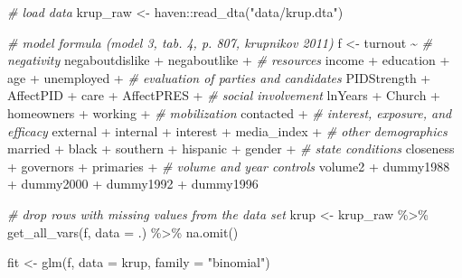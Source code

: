 \documentclass[
]{book}
\newenvironment{Shaded}{\begin{snugshade}}{\end{snugshade}}
\newcommand{\AttributeTok}[1]{\textcolor[rgb]{0.77,0.63,0.00}{#1}}
\newcommand{\CommentTok}[1]{\textcolor[rgb]{0.56,0.35,0.01}{\textit{#1}}}
\newcommand{\FunctionTok}[1]{\textcolor[rgb]{0.00,0.00,0.00}{#1}}
\newcommand{\NormalTok}[1]{#1}
\newcommand{\OtherTok}[1]{\textcolor[rgb]{0.56,0.35,0.01}{#1}}
\newcommand{\SpecialCharTok}[1]{\textcolor[rgb]{0.00,0.00,0.00}{#1}}
\newcommand{\StringTok}[1]{\textcolor[rgb]{0.31,0.60,0.02}{#1}}
\begin{document}
\begin{Shaded}
\begin{Highlighting}[]
\CommentTok{\# load data}
\NormalTok{krup\_raw }\OtherTok{\textless{}{-}}\NormalTok{ haven}\SpecialCharTok{::}\FunctionTok{read\_dta}\NormalTok{(}\StringTok{"data/krup.dta"}\NormalTok{) }

\CommentTok{\# model formula (model 3, tab. 4, p. 807, krupnikov 2011)}
\NormalTok{f }\OtherTok{\textless{}{-}}\NormalTok{ turnout }\SpecialCharTok{\textasciitilde{}} 
           \CommentTok{\# negativity}
\NormalTok{           negaboutdislike }\SpecialCharTok{+}\NormalTok{ negaboutlike }\SpecialCharTok{+}
           \CommentTok{\# resources}
\NormalTok{           income }\SpecialCharTok{+}\NormalTok{ education }\SpecialCharTok{+}\NormalTok{ age }\SpecialCharTok{+}\NormalTok{ unemployed }\SpecialCharTok{+}
           \CommentTok{\# evaluation of parties and candidates}
\NormalTok{           PIDStrength }\SpecialCharTok{+}\NormalTok{ AffectPID }\SpecialCharTok{+}\NormalTok{ care }\SpecialCharTok{+}\NormalTok{ AffectPRES }\SpecialCharTok{+}
           \CommentTok{\# social involvement}
\NormalTok{           lnYears }\SpecialCharTok{+}\NormalTok{ Church }\SpecialCharTok{+}\NormalTok{ homeowners }\SpecialCharTok{+}\NormalTok{ working }\SpecialCharTok{+} 
           \CommentTok{\# mobilization}
\NormalTok{           contacted }\SpecialCharTok{+} 
           \CommentTok{\# interest, exposure, and efficacy}
\NormalTok{           external }\SpecialCharTok{+}\NormalTok{ internal }\SpecialCharTok{+}\NormalTok{ interest }\SpecialCharTok{+}\NormalTok{ media\_index }\SpecialCharTok{+} 
           \CommentTok{\# other demographics}
\NormalTok{           married }\SpecialCharTok{+}\NormalTok{ black }\SpecialCharTok{+}\NormalTok{ southern }\SpecialCharTok{+}\NormalTok{ hispanic }\SpecialCharTok{+}\NormalTok{ gender }\SpecialCharTok{+} 
           \CommentTok{\# state conditions}
\NormalTok{           closeness }\SpecialCharTok{+}\NormalTok{ governors }\SpecialCharTok{+}\NormalTok{ primaries }\SpecialCharTok{+} 
           \CommentTok{\# volume and year controls}
\NormalTok{           volume2 }\SpecialCharTok{+}\NormalTok{ dummy1988 }\SpecialCharTok{+}\NormalTok{ dummy2000 }\SpecialCharTok{+}\NormalTok{ dummy1992 }\SpecialCharTok{+}\NormalTok{ dummy1996}

\CommentTok{\# drop rows with missing values from the data set}
\NormalTok{krup }\OtherTok{\textless{}{-}}\NormalTok{ krup\_raw }\SpecialCharTok{\%\textgreater{}\%}
  \FunctionTok{get\_all\_vars}\NormalTok{(f, }\AttributeTok{data =}\NormalTok{ .)  }\SpecialCharTok{\%\textgreater{}\%}
  \FunctionTok{na.omit}\NormalTok{()}

\NormalTok{fit }\OtherTok{\textless{}{-}} \FunctionTok{glm}\NormalTok{(f, }\AttributeTok{data =}\NormalTok{ krup, }\AttributeTok{family =} \StringTok{"binomial"}\NormalTok{)}
\end{Highlighting}
\end{Shaded}
\end{document}

